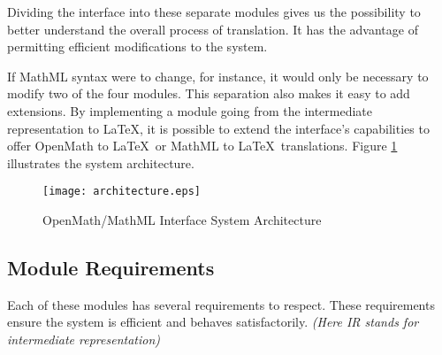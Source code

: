 Dividing the interface into these separate modules gives us the possibility to better understand the overall process of translation. It has the
advantage of permitting efficient modifications to the system.

If MathML syntax were to change, for instance, it would only be necessary to modify two of the four modules. This separation also makes it easy to
add extensions. By implementing a module going from the intermediate representation to \LaTeX, it is possible to extend the interface's
capabilities to offer OpenMath to \LaTeX~or MathML to \LaTeX~translations. Figure \ref{archi} illustrates the system architecture.

\begin{figure}

\begin{center}

{\texttt{[image: architecture.eps]}}

\caption{OpenMath/MathML Interface System Architecture}
\label{archi}

\end{center}

\end{figure}

\subsection{Module Requirements}

Each of these modules has several requirements to respect. These requirements ensure the system is efficient and behaves satisfactorily. {\it (Here
IR stands for intermediate representation)}

